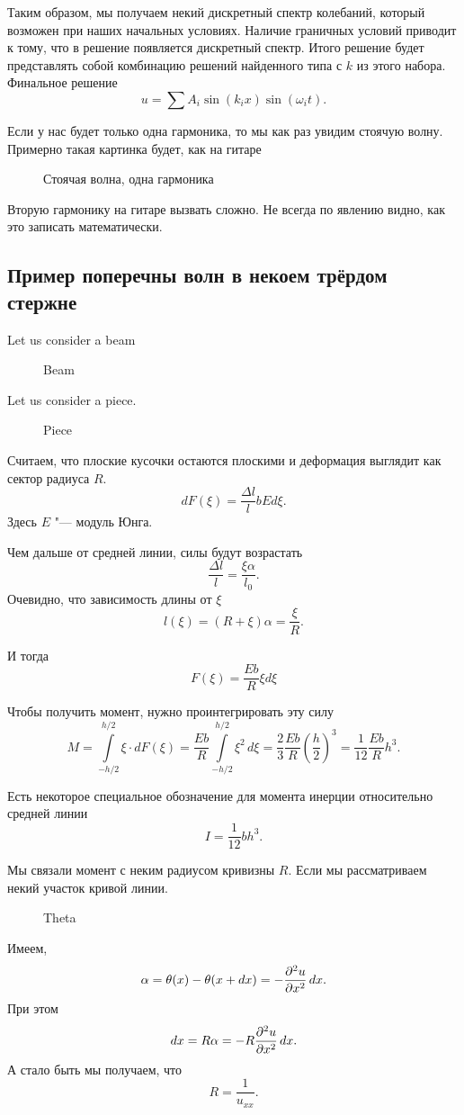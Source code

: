 Таким образом, мы получаем некий дискретный спектр колебаний, который возможен при наших начальных условиях. Наличие граничных условий приводит к тому, что в решение появляется дискретный спектр. Итого решение будет представлять собой комбинацию решений найденного типа с $k $ из этого набора. Финальное решение
\[
  u =  \sum A_i \sin(k_i x)\sin(\omega_i t).
\]

Если у нас будет только одна гармоника, то мы как раз увидим стоячую волну. Примерно такая картинка будет, как на гитаре
\begin{figure}[H]
  \centering
  \caption{Стоячая волна, одна гармоника}
  \label{fig:fixedwave}
\end{figure}

Вторую гармонику на гитаре вызвать сложно.
Не всегда по явлению видно, как это записать математически.

\subsection{Пример поперечны волн в некоем трёрдом стержне}
Let us consider a beam
\begin{figure}[H]
  \centering
  \caption{Beam}
  \label{fig:beam}
\end{figure}

Let us consider a piece.
\begin{figure}[H]
  \centering
  \caption{Piece}
  \label{fig:piece}
\end{figure}

Считаем, что плоские кусочки остаются плоскими и деформация выглядит как сектор радиуса $R$.
\[
  dF(\xi) = \frac{\Delta l}l b E d\xi.
\]
Здесь $E$ "--- модуль Юнга.

Чем дальше от средней линии, силы будут возрастать
\[
  \frac{\Delta l}{l} = \frac{\xi\alpha}{l_0}.
\]
Очевидно, что зависимость длины от $\xi$
\[
  l(\xi) = (R + \xi)\alpha = \frac{\xi}R.
\]

И тогда
\[
  F(\xi) = \frac{ Eb}{R} \xi d\xi
\]

Чтобы получить момент, нужно проинтегрировать эту силу
\[
  M = \int\limits_{-h/2}^{h/2} \xi \cdot dF(\xi) = \frac{Eb}{R}\int\limits_{-h/2}^{h/2} \xi^2\,d\xi = \frac23 \frac{Eb}{R}\left(\frac h2\right)^3 = \frac1{12} \frac{Eb}Rh^3.
\]

Есть некоторое специальное обозначение для момента инерции относительно средней линии
\[
  I = \frac1{12} bh^3.
\]

Мы связали момент с неким радиусом кривизны $R$.
Если мы рассматриваем некий участок кривой линии.
\begin{figure}[H]
  \centering
  \caption{Theta}
  \label{fig:theta}
\end{figure}
Имеем,
\[
   \alpha = \theta(x) - \theta(x+ dx) = -\frac{\partial ^2u}{\partial x^2}\,dx.
\]
При этом
\[
  dx = R\alpha = - R\frac{\partial ^2u}{\partial x^2}\,dx.
\]
А стало быть мы получаем, что
\[
  R = \frac 1{u_{xx}}.
\]

